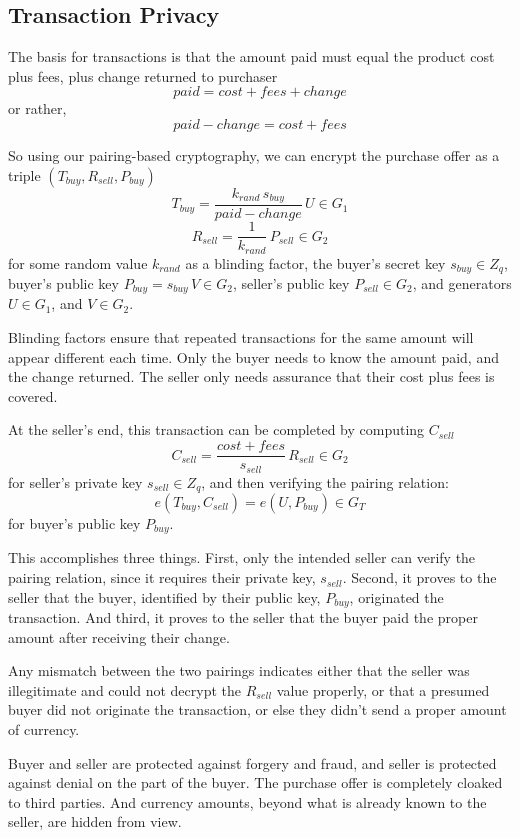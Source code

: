 \subsection{Transaction Privacy}
The basis for transactions is that the amount paid must equal the product cost plus fees, plus change returned to purchaser
$$ {paid} = {cost} + {fees} + {change}$$
or rather, 
$$ {paid} - {change} = {cost} + {fees}$$

So using our pairing-based cryptography, we can encrypt the purchase offer as a triple 
$(T_{buy},R_{sell}, P_{buy})$
$$ T_{buy} = \frac{k_{rand} \, s_{buy}}{paid - change} \, U \in G_1$$
$$ R_{sell} = \frac{1}{k_{rand}}\,P_{sell} \in G_2$$
for some random value $k_{rand}$ as a blinding factor, the buyer's secret key $s_{buy} \in Z_q$, buyer's public key $P_{buy} = s_{buy} \, V \in G_2$,  seller's public key $P_{sell} \in G_2$, and generators $U \in G_1$, and $V \in G_2$.

Blinding factors ensure that repeated transactions for the same amount will appear different each time. Only the buyer needs to know the amount paid, and the change returned. The seller only needs assurance that their cost plus fees is covered.

At the seller's end, this transaction can be completed by computing $C_{sell}$ 
$$ C_{sell} = \frac{cost+fees}{s_{sell}} \, R_{sell} \in G_2$$
for seller's private key $s_{sell} \in Z_q$, 
and then verifying the pairing relation:
$$ e(T_{buy},C_{sell}) = e(U,P_{buy}) \in G_T$$
for buyer's public key $P_{buy}$. 

This accomplishes three things. First, only the intended seller can verify the pairing relation, since it requires their private key, $s_{sell}$. Second, it proves to the seller that the buyer, identified by their public key, $P_{buy}$, originated the transaction. And third, it proves to the seller that the buyer paid the proper amount after receiving their change. 

Any mismatch between the two pairings indicates either that the seller was illegitimate and could not decrypt the $R_{sell}$ value properly, or that a presumed buyer did not originate the transaction, or else they didn't send a proper amount of currency. 

Buyer and seller are protected against forgery and fraud, and seller is protected against denial on the part of the buyer. The purchase offer is completely cloaked to third parties. And currency amounts, beyond what is already known to the seller, are hidden from  view.

